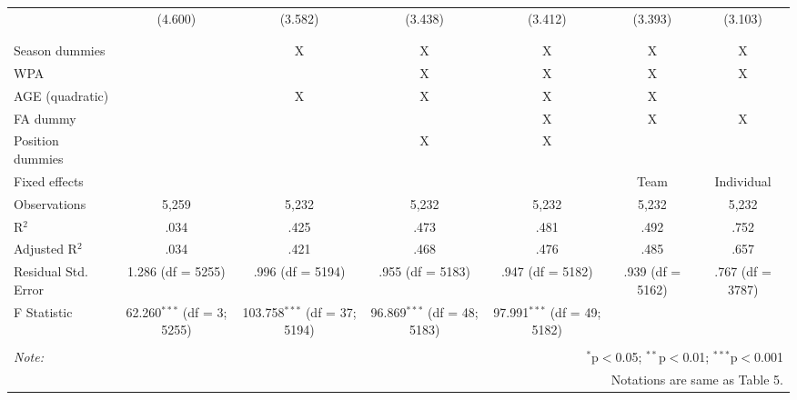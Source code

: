 \begin{table}[H]
\begin{tabular}{@{\extracolsep{5pt}}lcccccc}
  & (4.600) & (3.582) & (3.438) & (3.412) & (3.393) & (3.103) \\
  & & & & & & \\
\hline \\[-1.8ex]
Season dummies &  & X & X & X & X & X \\
WPA &  &  & X & X & X & X \\
AGE (quadratic) &  & X & X & X & X &  \\
FA dummy &  &  &  & X & X & X \\
Position dummies &  &  & X & X &  &  \\
Fixed effects &  &  &  &  & Team & Individual \\
Observations & 5,259 & 5,232 & 5,232 & 5,232 & 5,232 & 5,232 \\
R$^{2}$ & .034 & .425 & .473 & .481 & .492 & .752 \\
Adjusted R$^{2}$ & .034 & .421 & .468 & .476 & .485 & .657 \\
Residual Std. Error & 1.286 (df = 5255) & .996 (df = 5194) & .955 (df = 5183) & .947 (df = 5182) & .939 (df = 5162) & .767 (df = 3787) \\
F Statistic & 62.260$^{***}$ (df = 3; 5255) & 103.758$^{***}$ (df = 37; 5194) & 96.869$^{***}$ (df = 48; 5183) & 97.991$^{***}$ (df = 49; 5182) &  &  \\
\hline
\hline \\[-1.8ex]
\textit{Note:}  & \multicolumn{6}{r}{$^{*}$p$<$0.05; $^{**}$p$<$0.01; $^{***}$p$<$0.001} \\
& \multicolumn{6}{r}{Notations are same as Table 5.} \\
\end{tabular}
\end{table}

